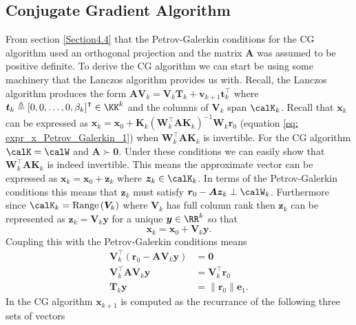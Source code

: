 \subsection{Conjugate Gradient Algorithm}\label{Section4.5}

From section \ref{Section4.4} that the Petrov-Galerkin conditions for the CG algorithm used an orthogonal projection and the matrix $\bm{A}$ was assumed to be positive definite. To derive the CG algorithm we can start be using some machinery that the Lanczos algorithm provides us with. Recall, the Lanczos algorithm produces the form $\bm{A}\bm{V}_{k} = \bm{V}_{k} \bm{T}_k + \bm{v}_{k+1} \bm{t}_{k}^{\intercal}$ where $\bm{t}_{k} \triangleq \left[ 0,0, \ldots , 0, \beta_k \right]^{\intercal} \in \KK^k$ and the columns of $\bm{V}_{k}$ span $\calK_k$. Recall that $\bm{x}_k$ can be expressed as $\bm{x}_k = \bm{x}_0 + \bm{K}_k \left( \bm{W}_k^{\intercal} \bm{A} \bm{K}_k \right)^{-1} \bm{W}_k \bm{r}_0$ (equation \ref{eq: expr_x_Petrov_Galerkin_1}) when $\bm{W}_k^{\intercal} \bm{A} \bm{K}_k$ is invertible. For the CG algorithm $\calK = \calW$ and $\bm{A} \succ \bm{0}$. Under these conditions we can easily show that $\bm{W}_k^{\intercal} \bm{A} \bm{K}_k$ is indeed invertible. This means the approximate vector can be expressed as $\bm{x}_k = \bm{x}_0 + \bm{z}_k$ where $\bm{z}_k \in \calK_k$. In terms of the Petrov-Galerkin conditions this means that $\bm{z}_k$ must satisfy $\bm{r}_0 - \bm{A} \bm{z}_k \perp \calW_k$. Furthermore since $\calK_k = \operatorname{Range} \left( \bm{V}_{k} \right)$ where $\bm{V}_{k}$ has full column rank then $\bm{z}_k$ can be represented as $\bm{z}_k = \bm{V}_{k} \bm{y}$ for a unique $\bm{y} \in \RR^k$ so that
\begin{equation} \label{eq: x_eq_Qky}
    \bm{x}_k = \bm{x}_0 + \bm{V}_{k} \bm{y}.
\end{equation}
Coupling this with the Petrov-Galerkin conditions means
\begin{align} \label{eq: Tky_eq_normr0e1}
    \bm{V}_{k}^{\intercal} \left( \bm{r}_0 - \bm{A} \bm{V}_{k} \bm{y} \right) & = \bm{0}                        \nonumber   \\
    \bm{V}_{k}^{\intercal} \bm{A} \bm{V}_{k} \bm{y}                           & = \bm{V}_{k}^{\intercal} \bm{r}_0 \nonumber \\
    \bm{T}_k \bm{y}                                                           & = \| \bm{r}_0 \| \bm{e}_1.
\end{align}
In the CG algorithm $\bm{x}_{k+1}$ is computed as the recurrance of the following three sets of vectors
